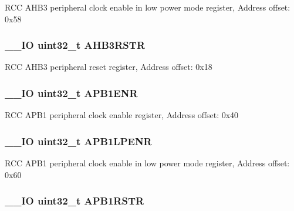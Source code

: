 R\-C\-C A\-H\-B3 peripheral clock enable in low power mode register, Address offset\-: 0x58 \hypertarget{struct_r_c_c___type_def_a28560c5bfeb45326ea7f2019dba57bea}{
\subsubsection[{A\-H\-B3\-R\-S\-T\-R}]{\setlength{\rightskip}{0pt plus 5cm}\-\_\-\-\_\-\-I\-O uint32\-\_\-t A\-H\-B3\-R\-S\-T\-R}}\label{struct_r_c_c___type_def_a28560c5bfeb45326ea7f2019dba57bea}
R\-C\-C A\-H\-B3 peripheral reset register, Address offset\-: 0x18 \hypertarget{struct_r_c_c___type_def_ac88901e2eb35079b7b58a185e6bf554c}{
\subsubsection[{A\-P\-B1\-E\-N\-R}]{\setlength{\rightskip}{0pt plus 5cm}\-\_\-\-\_\-\-I\-O uint32\-\_\-t A\-P\-B1\-E\-N\-R}}\label{struct_r_c_c___type_def_ac88901e2eb35079b7b58a185e6bf554c}
R\-C\-C A\-P\-B1 peripheral clock enable register, Address offset\-: 0x40 \hypertarget{struct_r_c_c___type_def_ad85a9951a7be79fe08ffc90f796f071b}{
\subsubsection[{A\-P\-B1\-L\-P\-E\-N\-R}]{\setlength{\rightskip}{0pt plus 5cm}\-\_\-\-\_\-\-I\-O uint32\-\_\-t A\-P\-B1\-L\-P\-E\-N\-R}}\label{struct_r_c_c___type_def_ad85a9951a7be79fe08ffc90f796f071b}
R\-C\-C A\-P\-B1 peripheral clock enable in low power mode register, Address offset\-: 0x60 \hypertarget{struct_r_c_c___type_def_a7da5d372374bc59e9b9af750b01d6a78}{
\subsubsection[{A\-P\-B1\-R\-S\-T\-R}]{\setlength{\rightskip}{0pt plus 5cm}\-\_\-\-\_\-\-I\-O uint32\-\_\-t A\-P\-B1\-R\-S\-T\-R}}\label{struct_r_c_c___type_def_a7da5d372374bc59e9b9af750b01d6a78}
